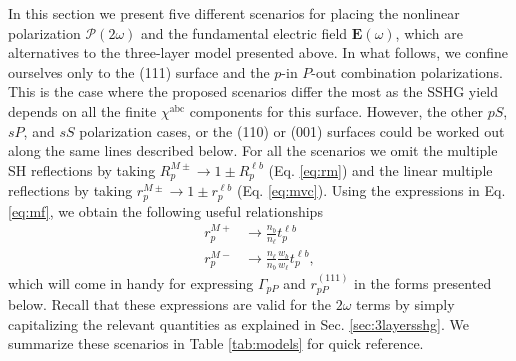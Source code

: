 In this section we present five different scenarios for placing the nonlinear
polarization $\boldsymbol{\mathcal{P}}(2\omega)$ and the fundamental electric
field $\mathbf{E}(\omega)$, which are alternatives to the three-layer model
presented above. In what follows, we confine ourselves only to the (111) surface
and the $p$-in $P$-out combination polarizations. This is the case where the
proposed scenarios differ the most as the SSHG yield depends on all the finite
$\chi^{\mathrm{abc}}$ components for this surface. However, the other $pS$,
$sP$, and $sS$ polarization cases, or the (110) or (001) surfaces could be
worked out along the same lines described below. For all the scenarios we omit
the multiple SH reflections by taking $R^{M\pm}_{p}\to 1\pm R^{\ell b}_{p}$ (Eq.
\eqref{eq:rm}) and the linear multiple reflections by taking $r^{M\pm}_{p}\to
1\pm r^{\ell b}_{p}$ (Eq. \eqref{eq:mvc}). Using the expressions in Eq.
\eqref{eq:mf}, we obtain the following useful relationships
\begin{equation}\label{eq:mvc89}
\begin{split}
r^{M+}_{p}&\to\frac{n_{b}}{n_{\ell}}t^{\ell b}_{p}\\
r^{M-}_{p}&\to\frac{n_{\ell}}{n_{b}}\frac{w_{b}}{w_{\ell}}t^{\ell b}_{p},
\end{split}
\end{equation}
which will come in handy for expressing $\Gamma_{pP}$ and $r^{(111)}_{pP}$ in
the forms presented below. Recall that these expressions are valid for the
$2\omega$ terms by simply capitalizing the relevant quantities as explained in
Sec. \ref{sec:3layersshg}. We summarize these scenarios in Table
\ref{tab:models} for quick reference.

